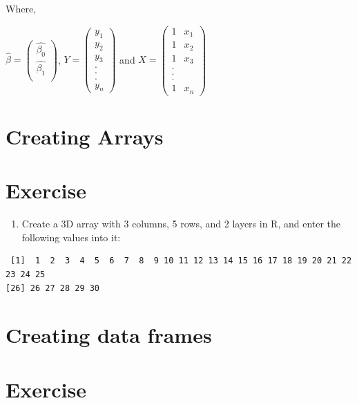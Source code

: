 \documentclass[
  letterpaper,
  DIV=11,
  numbers=noendperiod]{scrreprt}
\providecommand{\tightlist}{%
  \setlength{\itemsep}{0pt}\setlength{\parskip}{0pt}}\usepackage{longtable,booktabs,array}
\begin{document}
Where,

\(\hat{\beta} =\begin{pmatrix} \hat{\beta_0} \\ \hat{\beta_1} \\ \end{pmatrix}\),
\(Y = \begin{pmatrix} y_1 \\ y_2 \\ y_3 \\ . \\ . \\ . \\ y_n \end{pmatrix}\)
and
\(X = \begin{pmatrix} 1 & x_1 \\ 1 & x_2 \\ 1 & x_3 \\ . \\ . \\ . \\ 1 & x_n \end{pmatrix}\)

\hypertarget{creating-arrays}{%
\section{Creating Arrays}\label{creating-arrays}}

\hypertarget{exercise-3}{%
\section{Exercise}\label{exercise-3}}

\begin{enumerate}
\def\labelenumi{\arabic{enumi}.}
\tightlist
\item
  Create a 3D array with 3 columns, 5 rows, and 2 layers in R, and enter
  the following values into it:
\end{enumerate}

\begin{verbatim}
 [1]  1  2  3  4  5  6  7  8  9 10 11 12 13 14 15 16 17 18 19 20 21 22 23 24 25
[26] 26 27 28 29 30
\end{verbatim}

\hypertarget{creating-data-frames}{%
\section{Creating data frames}\label{creating-data-frames}}

\hypertarget{exercise-4}{%
\section{Exercise}\label{exercise-4}}
\end{document}
